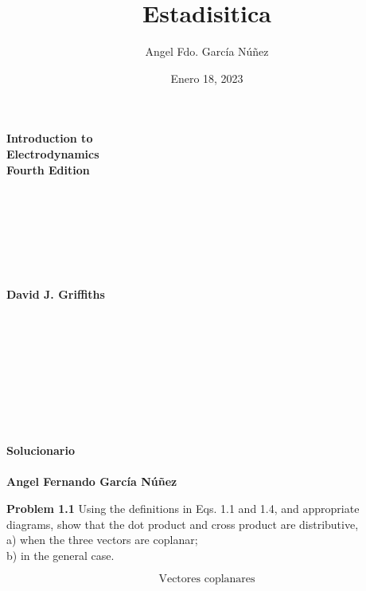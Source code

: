 \documentclass[10pt,a4papper]{article}
\author{Angel Fdo. García Núñez}
\date{Enero 18, 2023}
\title{Estadisitica}
\begin{document}
\Huge
\textbf{Introduction to}\\
\textbf{Electrodynamics}\\

\large
\textbf{Fourth Edition}\\\\\\\\\\\\\\\\

\textbf{David J. Griffiths}\\\\\\\\\\\\\\\\\\\\

\Large
\textbf{Solucionario}\\\\
\large
\textbf{Angel Fernando García Núñez}

\Large
\newpage
\textbf{Problem 1.1} Using the definitions in Eqs. 1.1 and 1.4, and appropriate\\
diagrams, show that the dot product and cross product are distributive,\\

a) when the three vectors are coplanar;\\

b) in the general case.


\newpage
\[\text{Vectores coplanares}\]
\end{document}
